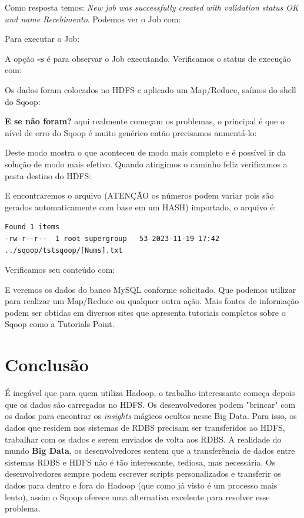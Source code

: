 \documentclass[a4paper,11pt]{article}
\begin{document}
Como resposta temos: \textit{New job was successfully created with validation status OK and name Recebimento}. Podemos ver o Job com: \\

Para executar o Job: \\

A opção \textbf{-s} é para observar o Job executando. Verificamos o status de execução com: \\

Os dados foram colocados no HDFS e aplicado um Map/Reduce, saímos do shell do Sqoop: \\

\textbf{E se não foram?} aqui realmente começam os problemas, o principal é que o nível de erro do Sqoop é muito genérico então precisamos aumentá-lo: \\

Deste modo mostra o que aconteceu de modo mais completo e é possível ir da solução de modo mais efetivo. Quando atingimos o caminho feliz verificamos a pasta destino do HDFS: \\

E encontraremos o arquivo (ATENÇÃO os números podem variar pois são gerados automaticamente com base em um HASH) importado, o arquivo é:
\begin{lstlisting}[]
Found 1 items
-rw-r--r--  1 root supergroup   53 2023-11-19 17:42 ../sqoop/tstsqoop/[Nums].txt
\end{lstlisting}

Verificamos seu conteúdo com: \\

E veremos os dados do banco MySQL conforme solicitado. Que podemos utilizar para realizar um Map/Reduce ou qualquer outra ação. Mais fontes de informação podem ser obtidas em diversos sites que apresenta tutoriais completos sobre o Sqoop como a Tutorials Point\cite{tutorialspoint}.

\section{Conclusão}
É inegável que para quem utiliza Hadoop, o trabalho interessante começa depois que os dados são carregados no HDFS. Os desenvolvedores podem "brincar" com os dados para encontrar os \textit{insights} mágicos ocultos nesse Big Data. Para isso, os dados que residem nos sistemas de RDBS precisam ser transferidos ao HDFS, trabalhar com os dados e serem enviados de volta aos RDBS. A realidade do mundo \textbf{Big Data}, os desenvolvedores sentem que a transferência de dados entre sistemas RDBS e HDFS não é tão interessante, tediosa, mas necessária. Os desenvolvedores sempre podem escrever scripts personalizados e transferir os dados para dentro e fora do Hadoop (que como já visto é um processo mais lento), assim o Sqoop oferece uma alternativa excelente para resolver esse problema.
\end{document}
